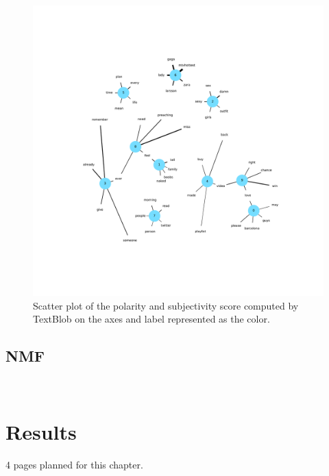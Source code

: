 \begin{figure}
    \centering
    \caption{Scatter plot of the polarity and subjectivity score computed by TextBlob on the axes and label represented as the color.}
    \label{fig:textblob}
    \includegraphics[width=\textwidth]{../figures/lda_network_graph.pdf}
\end{figure}


\subsection{NMF}
\label{subsec:nmf}

~\cite{Choo2013}

\section{Results}
\label{sec:results}


4 pages planned for this chapter.
\pagebreak[4]